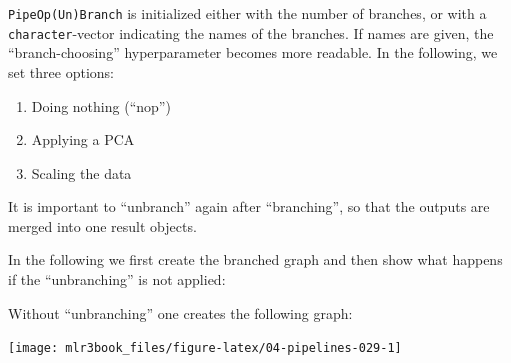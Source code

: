 \documentclass[]{article}
\newenvironment{Shaded}{\begin{snugshade}}{\end{snugshade}}
\newcommand{\DataTypeTok}[1]{\textcolor[rgb]{0.13,0.29,0.53}{#1}}
\newcommand{\KeywordTok}[1]{\textcolor[rgb]{0.13,0.29,0.53}{\textbf{#1}}}
\newcommand{\NormalTok}[1]{#1}
\newcommand{\OperatorTok}[1]{\textcolor[rgb]{0.81,0.36,0.00}{\textbf{#1}}}
\newcommand{\OtherTok}[1]{\textcolor[rgb]{0.56,0.35,0.01}{#1}}
\newcommand{\StringTok}[1]{\textcolor[rgb]{0.31,0.60,0.02}{#1}}
\providecommand{\tightlist}{%
  \setlength{\itemsep}{0pt}\setlength{\parskip}{0pt}}
\renewenvironment{Shaded} {\begin{snugshade}\small} {\end{snugshade}}
\begin{document}
\texttt{PipeOp(Un)Branch} is initialized either with the number of branches, or with a \texttt{character}-vector indicating the names of the branches.
If names are given, the ``branch-choosing'' hyperparameter becomes more readable.
In the following, we set three options:

\begin{enumerate}
\def\labelenumi{\arabic{enumi}.}
\tightlist
\item
  Doing nothing (``nop'')
\item
  Applying a PCA
\item
  Scaling the data
\end{enumerate}

It is important to ``unbranch'' again after ``branching'', so that the outputs are merged into one result objects.

In the following we first create the branched graph and then show what happens if the ``unbranching'' is not applied:

\begin{Shaded}
\end{Shaded}

Without ``unbranching'' one creates the following graph:

\begin{Shaded}
\end{Shaded}

\begin{flushright}\texttt{[image: mlr3book\_files/figure-latex/04-pipelines-029-1]} \end{flushright}
\end{document}
